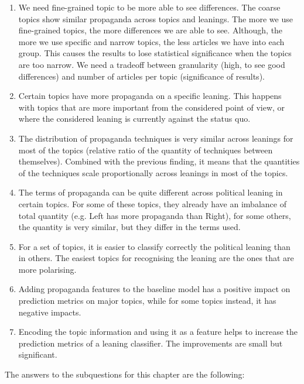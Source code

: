 \begin{enumerate}
    \item We need fine-grained topic to be more able to see differences. The coarse topics show similar propaganda across topics and leanings. The more we use fine-grained topics, the more differences we are able to see.
    Although, the more we use specific and narrow topics, the less articles we have into each group. This causes the results to lose statistical significance when the topics are too narrow.
    We need a tradeoff between granularity (high, to see good differences) and number of articles per topic (significance of results).
    \item Certain topics have more propaganda on a specific leaning. This happens with topics that are more important from the considered point of view, or where the considered leaning is currently against the status quo.
    \item The distribution of propaganda techniques is very similar across leanings for most of the topics (relative ratio of the quantity of techniques between themselves). Combined with the previous finding, it means that the quantities of the techniques scale proportionally across leanings in most of the topics.
    \item The terms of propaganda can be quite different across political leaning in certain topics. For some of these topics, they already have an imbalance of total quantity (e.g. Left has more propaganda than Right), for some others, the quantity is very similar, but they differ in the terms used.
    \item For a set of topics, it is easier to classify correctly the political leaning than in others. The easiest topics for recognising the leaning are the ones that are more polarising.
    \item Adding propaganda features to the baseline model has a positive impact on prediction metrics on major topics, while for some topics instead, it has negative impacts.
    \item Encoding the topic information and using it as a feature helps to increase the prediction metrics of a leaning classifier. The improvements are small but significant.
\end{enumerate}


The answers to the subquestions for this chapter are the following:

